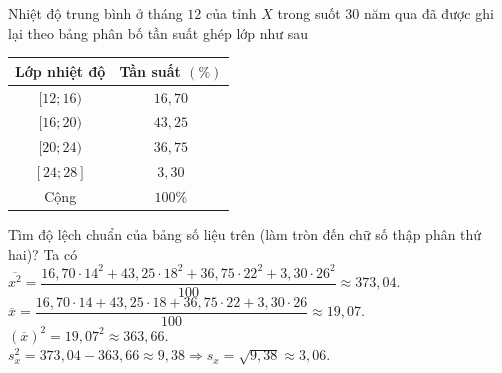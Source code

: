 \begin{ex}%
	Nhiệt độ trung bình ở tháng $12$ của tỉnh $X$ trong suốt $30$ năm qua đã được ghi lại theo bảng phân bố tần suất ghép lớp như sau
	\begin{center} 
		\begin{tabular}{|c|c|}\hline
			{Lớp nhiệt độ}&{Tần suất $(\%)$}\\
			\hline
			{$[12;16)$}&{$16{,}70$}\\
			\hline
			{$[16;20)$}&{$43{,}25$}\\
			\hline
			{$[20;24)$}&{$36{,}75$}\\
			\hline
			{$[24;28]$}&{$3{,}30$}\\
			\hline
			{Cộng}&{$100\%$}\\
			\hline
		\end{tabular}
	\end{center}
	Tìm độ lệch chuẩn của bảng số liệu trên (làm tròn đến chữ số thập phân thứ hai)?
	\loigiai
	{Ta có\\
		$\overline{x^2}=\dfrac{16{,}70\cdot 14^2+43{,}25\cdot 18^2+36{,}75\cdot 22^2+3{,}30\cdot 26^2}{100}\approx373{,}04$.\\
		$\overline{x}=\dfrac{16{,}70\cdot 14+43{,}25\cdot 18+36{,}75\cdot 22+3{,}30\cdot 26}{100}\approx 19{,}07$.\\
		$(\overline{x})^2=19{,}07^2\approx 363{,}66$.\\
		$s_x^2=373{,}04-363{,}66\approx 9{,}38 \Rightarrow s_x=\sqrt{9{,}38}\approx 3{,}06$.
	}
\end{ex}

